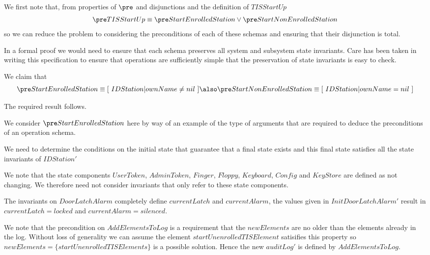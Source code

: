 We first note that, from properties of $\pre$ and disjunctions and the
definition of $TISStartUp$  
\[
\pre TISStartUp \equiv \pre StartEnrolledStation \lor \pre
StartNonEnrolledStation
\]
so we can reduce the problem to considering the preconditions of each
of these schemas and ensuring that their disjunction is total.

In a formal proof we would need to ensure that each schema preserves
all system and subsystem state invariants. Care has been taken in
writing this specification to ensure that operations are sufficiently
simple that the preservation of state invariants is easy to check.

We claim that 
\[
\pre StartEnrolledStation \equiv [~ IDStation | ownName \neq \Nil ~] 
\also
\pre StartNonEnrolledStation \equiv [~ IDStation | ownName = \Nil ~]
\]

The required result follows. 

We consider $\pre StartEnrolledStation$ here by way of an example of the
type of arguments that are required to deduce the preconditions of an
operation schema.

We need to determine the conditions on the initial state that
guarantee that a final state exists and this final state satisfies all
the state invariants of $IDStation'$

We note that the state components $UserToken$, $AdminToken$, $Finger$,
$Floppy$, $Keyboard$, $Config$ and $KeyStore$ are defined as not
changing. We therefore need not consider invariants that only refer to
these state components.

The invariants on $DoorLatchAlarm$ completely define $currentLatch$
and $currentAlarm$, the values given in $InitDoorLatchAlarm'$ result in
$currentLatch = locked$ and $currentAlarm = silenced$.

We note that the precondition on $AddElementsToLog$ is a requirement
that the $newElements$ are no older than the elements already in the
log. Without loss of generality we can assume the element
$startUnenrolledTISElement$ satisifies this property so $newElements =
\{ startUnenrolledTISElements \}$ is a possible solution. Hence the new
$auditLog'$ is defined by $AddElementsToLog$.

